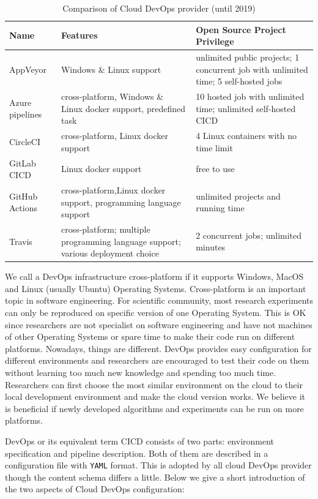 \documentclass{IEEEcsmag}
\begin{document}
\begin{table}
\caption{Comparison of Cloud DevOps provider (until 2019)}
\label{table}
\small
\begin{tabular*}{17.5pc}{@{}|p{39pt}|p{73pt}<{\raggedright}|p{60pt}<{\raggedright}|@{}}
\hline
Name& 
Features& 
Open Source Project Privilege\\
\hline
AppVeyor& Windows \& Linux support & unlimited public projects; 1 concurrent job with unlimited time; 5 self-hosted jobs
 \\
 \hline
 Azure pipelines & cross-platform, Windows \& Linux docker support, predefined task & 10 hosted job with unlimited time; unlimited self-hosted CICD
 \\
 \hline
   CircleCI & cross-platform, Linux docker support & 4 Linux containers with no time limit  \\
 \hline
GitLab CICD& Linux docker support & free to use

\\
\hline
GitHub Actions& cross-platform,Linux docker support, programming language support
& unlimited projects and running time
\\
\hline
Travis& 
cross-platform; multiple programming language support; various deployment choice
& 2 concurrent jobs; unlimited minutes
\\
\hline
\end{tabular*}
\label{tab1}
\end{table}

We call a DevOps infrastructure cross-platform if it supports Windows, MacOS and Linux (usually Ubuntu) Operating Systems.
Cross-platform is an important topic in software engineering. For scientific community, most research experiments can only be reproduced on specific version of one Operating System. This is OK since researchers are not specialist on software engineering and have not machines of other Operating Systems or spare time to make their code run on different platforms. Nowadays, things are different. DevOps provides easy configuration for different environments and researchers are encouraged to test their code on them without learning too much new knowledge and spending too much time. Researchers can first choose the most similar environment on the cloud to their local development environment and make the cloud version works. We believe it is beneficial if newly developed algorithms and experiments can be run on more platforms. 

DevOps or its equivalent term CICD consists of two parts: environment specification and pipeline description. 
Both of them are described in a configuration file with \texttt{YAML} format. This is adopted by all cloud DevOps provider though the content schema differs a little. Below we give a short introduction of the two aspects of Cloud DevOps configuration:
\end{document}
